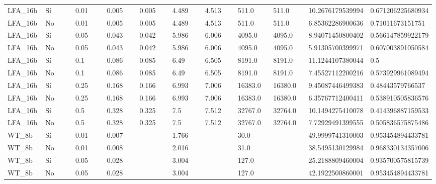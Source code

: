 {{\begin{longtable}{M{0.09\linewidth}M{0.09\linewidth}M{0.09\linewidth}M{0.09\linewidth}M{0.09\linewidth}M{0.09\linewidth}M{0.09\linewidth}M{0.09\linewidth}M{0.09\linewidth}M{0.09\linewidth}M{0.09\linewidth}}
LFA\_16b & Sí & \num{0.01} & \num{0.005} & \num{0.005} & \num{4.489} & \num{4.513} & \num{511.0} & \num{511.0} & \num{10.2676179539994} & \num{0.671206225680934} \\
LFA\_16b & No & \num{0.01} & \num{0.005} & \num{0.005} & \num{4.489} & \num{4.513} & \num{511.0} & \num{511.0} & \num{6.85362286900636} & \num{0.71011673151751} \\
LFA\_16b & Sí & \num{0.05} & \num{0.043} & \num{0.042} & \num{5.986} & \num{6.006} & \num{4095.0} & \num{4095.0} & \num{8.94071450800402} & \num{0.566147859922179} \\
LFA\_16b & No & \num{0.05} & \num{0.043} & \num{0.042} & \num{5.986} & \num{6.006} & \num{4095.0} & \num{4095.0} & \num{5.91305700399971} & \num{0.607003891050584} \\
LFA\_16b & Sí & \num{0.1} & \num{0.086} & \num{0.085} & \num{6.49} & \num{6.505} & \num{8191.0} & \num{8191.0} & \num{11.1244107380044} & \num{0.5} \\
LFA\_16b & No & \num{0.1} & \num{0.086} & \num{0.085} & \num{6.49} & \num{6.505} & \num{8191.0} & \num{8191.0} & \num{7.45527112200216} & \num{0.573929961089494} \\
LFA\_16b & Sí & \num{0.25} & \num{0.168} & \num{0.166} & \num{6.993} & \num{7.006} & \num{16383.0} & \num{16380.0} & \num{9.45087446499383} & \num{0.48443579766537} \\
LFA\_16b & No & \num{0.25} & \num{0.168} & \num{0.166} & \num{6.993} & \num{7.006} & \num{16383.0} & \num{16380.0} & \num{6.35767712400411} & \num{0.538910505836576} \\
LFA\_16b & Sí & \num{0.5} & \num{0.328} & \num{0.325} & \num{7.5} & \num{7.512} & \num{32767.0} & \num{32764.0} & \num{10.1494275410078} & \num{0.414396887159533} \\
LFA\_16b & No & \num{0.5} & \num{0.328} & \num{0.325} & \num{7.5} & \num{7.512} & \num{32767.0} & \num{32764.0} & \num{7.72929491399555} & \num{0.505836575875486} \\
WT\_8b & Sí & \num{0.01} & \num{0.007} &   & \num{1.766} &   & \num{30.0} &   & \num{49.9999741310003} & \num{0.953454894433781} \\
WT\_8b & No & \num{0.01} & \num{0.008} &   & \num{2.016} &   & \num{31.0} &   & \num{38.5495130129984} & \num{0.968330134357006} \\
WT\_8b & Sí & \num{0.05} & \num{0.028} &   & \num{3.004} &   & \num{127.0} &   & \num{25.2188809460004} & \num{0.935700575815739} \\
WT\_8b & No & \num{0.05} & \num{0.028} &   & \num{3.004} &   & \num{127.0} &   & \num{42.1922500860001} & \num{0.953454894433781} \\

\end{longtable}}}
